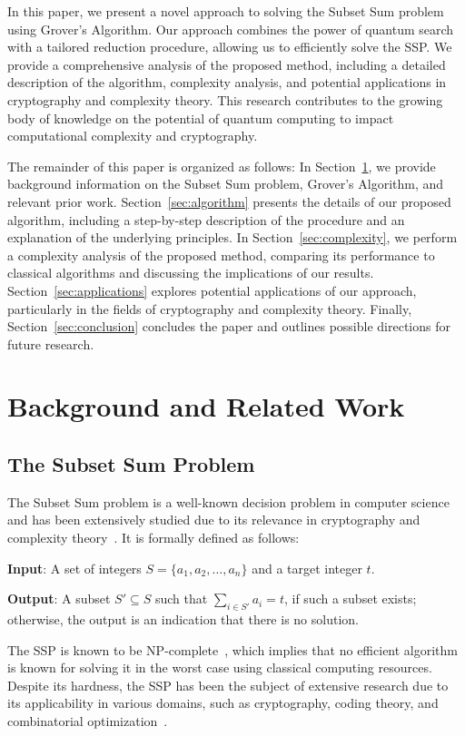In this paper, we present a novel approach to solving the Subset Sum problem using Grover's Algorithm. Our approach combines the power of quantum search with a tailored reduction procedure, allowing us to efficiently solve the SSP. We provide a comprehensive analysis of the proposed method, including a detailed description of the algorithm, complexity analysis, and potential applications in cryptography and complexity theory. This research contributes to the growing body of knowledge on the potential of quantum computing to impact computational complexity and cryptography.

The remainder of this paper is organized as follows: In Section~\ref{sec:background}, we provide background information on the Subset Sum problem, Grover's Algorithm, and relevant prior work. Section~\ref{sec:algorithm} presents the details of our proposed algorithm, including a step-by-step description of the procedure and an explanation of the underlying principles. In Section~\ref{sec:complexity}, we perform a complexity analysis of the proposed method, comparing its performance to classical algorithms and discussing the implications of our results. Section~\ref{sec:applications} explores potential applications of our approach, particularly in the fields of cryptography and complexity theory. Finally, Section~\ref{sec:conclusion} concludes the paper and outlines possible directions for future research.

\section{Background and Related Work}\label{sec:background}

\subsection{The Subset Sum Problem}

The Subset Sum problem is a well-known decision problem in computer science and has been extensively studied due to its relevance in cryptography and complexity theory~\cite{merkle1988one}. It is formally defined as follows:

\textbf{Input}: A set of integers $S = \{a_1, a_2, \ldots, a_n\}$ and a target integer $t$.

\textbf{Output}: A subset $S' \subseteq S$ such that $\sum_{i \in S'} a_i = t$, if such a subset exists; otherwise, the output is an indication that there is no solution.

The SSP is known to be NP-complete~\cite{garey1979computers}, which implies that no efficient algorithm is known for solving it in the worst case using classical computing resources. Despite its hardness, the SSP has been the subject of extensive research due to its applicability in various domains, such as cryptography, coding theory, and combinatorial optimization~\cite{koblitz1994cryptographic, dyer1999approximation}.

